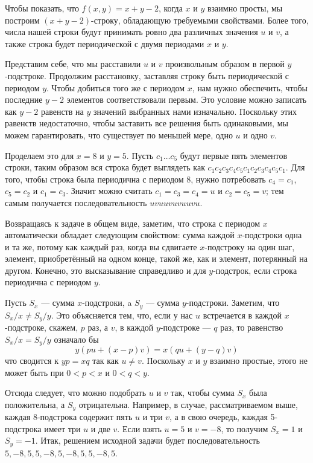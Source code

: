 Чтобы показать, что $f(x,y)=x+y-2$, когда $x$ и $y$ взаимно просты, мы построим $(x+y-2)$-строку, обладающую требуемыми свойствами.
Более того, числа нашей строки будут принимать ровно два различных значения $u$ и $v$,
а также строка будет периодической с двумя периодами $x$ и $y$.

Представим себе, что мы расставили $u$ и $v$ произвольным образом в первой $y$-подстроке.
Продолжим расстановку, заставляя строку быть периодической с периодом $y$.
Чтобы добиться того же с периодом $x$,
нам нужно обеспечить, чтобы последние $y-2$ элементов соответствовали первым.
Это условие можно записать как $y-2$ равенств на $y$ значений выбранных нами изначально.
Поскольку этих равенств недостаточно, чтобы заставить все решения быть одинаковыми, мы можем гарантировать, что существует по меньшей мере, одно $u$ и одно $v$.

Проделаем это для $x=8$ и $y=5$.
Пусть $c_1\dots c_5$ будут первые пять элементов строки, 
таким образом вся строка будет выглядеть как
$c_1c_2c_3c_4c_5c_1c_2c_3c_4c_5c_1$.
Для того, чтобы строка была периодична с периодом 8, 
нужно потребовать $c_4=c_1$, $c_5=c_2$ и $c_1=c_3$.
Значит можно считать $c_1=c_3=c_4=u$ и $c_2=c_5=v$; 
тем самым получается последовательность $uvuuvuvuuvu$.

Возвращаясь к задаче в общем виде, 
заметим, что строка с периодом $x$ автоматически обладает следующим свойством: сумма каждой $x$-подстроки одна и та же, потому как каждый раз, когда вы сдвигаете $x$-подстроку на один шаг, элемент, приобретённый на одном конце, такой же, как и элемент, потерянный на другом.
Конечно, это высказывание справедливо и для $y$-подстрок, если строка периодична с периодом $y$.

Пусть $S_x$ --- сумма $x$-подстроки, a $S_y$ --- сумма $y$-подстроки.
Заметим, что $S_x/x\ne S_y/y$.
Это объясняется тем, что, если у нас $u$ встречается в каждой
 $x$-подстроке, скажем, $p$ раз, а $v$, в каждой $y$-подстроке --- $q$ раз, 
 то равенство $S_x/x=S_y/y$
 означало бы 
\[y(pu+(x-p)v)=x(qu+(y-q)v)\]
что сводится к $yp=xq$ так как $u\ne v$.
Поскольку $x$ и $y$ взаимно простые, этого не может быть при $0<p<x$ и $0<q<y$.

Отсюда следует, что можно подобрать $u$ и $v$ так, чтобы сумма $S_x$ была положительна, а $S_y$ отрицательна.
Например, в случае, рассматриваемом выше, каждая 8-подстрока содержит пять $u$ и три $v$, 
а в свою очередь, каждая 5-подстрока имеет три $u$ и две $v$.
Если взять $u=5$ и $v=-8$, то получим $S_x=1$ и $S_y=-1$.
Итак, решением исходной задачи будет последовательность $5,-8,5,5,-8,5,-8,5,5,-8,5$.
\heart

